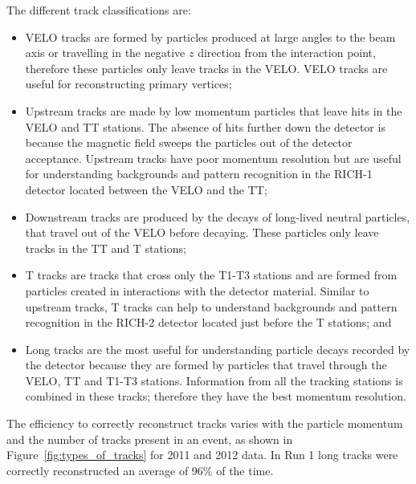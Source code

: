 The different track classifications are:
\begin{itemize}
\item  VELO tracks are formed by particles produced at large angles to the beam axis or travelling in the negative $z$ direction from the interaction point, therefore these particles only leave tracks in the VELO. VELO tracks are useful for reconstructing primary vertices;  
\item Upstream tracks are made by low momentum particles that leave hits in the VELO and TT stations. The absence of hits further down the detector is because the magnetic field sweeps the particles out of the detector acceptance. Upstream tracks have poor momentum resolution but are useful for understanding backgrounds and pattern recognition in the RICH-1 detector located between the VELO and the TT;
\item Downstream tracks are produced by the decays of long-lived neutral particles, that travel out of the VELO before decaying. These particles only leave tracks in the TT and T stations; 
\item T tracks are tracks that cross only the T1-T3 stations and are formed from particles created in interactions with the detector material. Similar to upstream tracks, T tracks can help to understand backgrounds and pattern recognition in the RICH-2 detector located just before the T stations; and
\item Long tracks are the most useful for understanding particle decays recorded by the detector because they are formed by particles that travel through the VELO, TT and T1-T3 stations. Information from all the tracking stations is combined in these tracks; therefore they have the best momentum resolution.
\end{itemize}



The efficiency to correctly reconstruct tracks varies with the particle momentum and the number of tracks present in an event, as shown in Figure~\ref{fig:types_of_tracks} for 2011 and 2012 data. In Run 1 long tracks were correctly reconstructed an average of 96$\%$ of the time.





